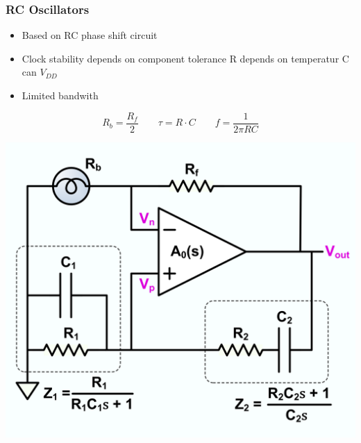 \begin{minipage}{0.5\linewidth}
\subsubsection{RC Oscillators}
\begin{itemize}
    \item Based on \acs{RC} phase shift circuit
    \item Clock stability depends on component tolerance
        \subitem R depends on temperatur
        \subitem C can $ V_{DD}$
    \item Limited bandwith   
\end{itemize}
\[ R_b = \dfrac{R_f}{2} \qquad \tau=R\cdot C \qquad f = \dfrac{1}{2 \pi RC}  \]
\end{minipage}
\begin{minipage}{0.5\linewidth}
    \hspace{1cm}\includegraphics[width=0.7\linewidth]{images/RCOscillator} 
\end{minipage}

